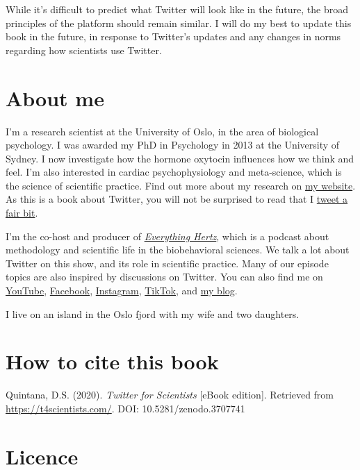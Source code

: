 \documentclass[
]{book}
\begin{document}
While it's difficult to predict what Twitter will look like in the future, the broad principles of the platform should remain similar. I will do my best to update this book in the future, in response to Twitter's updates and any changes in norms regarding how scientists use Twitter.

\hypertarget{about-me}{%
\section*{About me}\label{about-me}}

I'm a research scientist at the University of Oslo, in the area of biological psychology. I was awarded my PhD in Psychology in 2013 at the University of Sydney. I now investigate how the hormone oxytocin influences how we think and feel. I'm also interested in cardiac psychophysiology and meta-science, which is the science of scientific practice. Find out more about my research on \href{https://www.dsquintana.com/}{my website}. As this is a book about Twitter, you will not be surprised to read that I \href{https://twitter.com/dsquintana}{tweet a fair bit}.

I'm the co-host and producer of \href{https://everythinghertz.com/}{\emph{Everything Hertz}}, which is a podcast about methodology and scientific life in the biobehavioral sciences. We talk a lot about Twitter on this show, and its role in scientific practice. Many of our episode topics are also inspired by discussions on Twitter. You can also find me on \href{https://www.youtube.com/user/dsquintana85}{YouTube}, \href{https://www.facebook.com/dsquintana.research}{Facebook}, \href{https://www.instagram.com/dsquintana}{Instagram}, \href{https://www.tiktok.com/@dsquintana}{TikTok}, and \href{https://www.dsquintana.blog/}{my blog}.

I live on an island in the Oslo fjord with my wife and two daughters.

\hypertarget{how-to-cite-this-book}{%
\section*{How to cite this book}\label{how-to-cite-this-book}}

Quintana, D.S. (2020). \emph{Twitter for Scientists} {[}eBook edition{]}. Retrieved from \url{https://t4scientists.com/}. DOI: 10.5281/zenodo.3707741

\hypertarget{licence}{%
\section*{Licence}\label{licence}}
\end{document}
